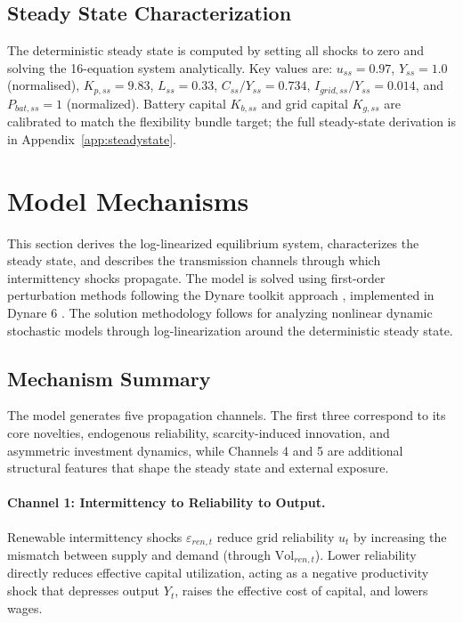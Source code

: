 	\subsection{Steady State Characterization}
	The deterministic steady state is computed by setting all shocks to zero and solving the 16-equation system analytically. 	Key values are: $u_{ss} = 0.97$, $Y_{ss} = 1.0$ (normalised), $K_{p,ss} = 9.83$, $L_{ss} = 0.33$, $C_{ss}/Y_{ss} = 0.734$, $I_{grid,ss}/Y_{ss} = 0.014$, and $P_{bat,ss} = 1$ (normalized). Battery capital $K_{b,ss}$ and grid capital $K_{g,ss}$ are calibrated to match the flexibility bundle target; the full steady-state derivation is in Appendix~\ref{app:steadystate}.

	\section{Model Mechanisms} \label{sec:mechanics}
	
	This section derives the log-linearized equilibrium system, characterizes the steady state, and describes the transmission channels through which intermittency shocks propagate. The model is solved using first-order perturbation methods following the Dynare toolkit approach \citep{Adjemianetal2024}, implemented in Dynare 6 \citep{Adjemianetal2024}. The solution methodology follows \citet{uhlig1999} for analyzing nonlinear dynamic stochastic models through log-linearization around the deterministic steady state.
	
	\subsection{Mechanism Summary}
	
	The model generates five propagation channels. The first three correspond to its core novelties, endogenous reliability, scarcity-induced innovation, and asymmetric investment dynamics, while Channels 4 and 5 are additional structural features that shape the steady state and external exposure.
	
	\paragraph{Channel 1: Intermittency to Reliability to Output.}
	Renewable intermittency shocks $\varepsilon_{ren,t}$ reduce grid reliability $u_t$ by increasing the mismatch between supply and demand (through $\text{Vol}_{ren,t}$). Lower reliability directly reduces effective capital utilization, acting as a negative productivity shock that depresses output $Y_t$, raises the effective cost of capital, and lowers wages.
	
